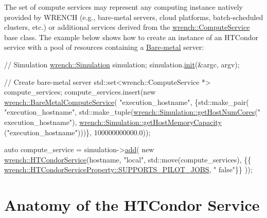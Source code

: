The set of compute services may represent any computing instance natively provided by W\+R\+E\+N\+CH (e.\+g., bare-\/metal servers, cloud platforms, batch-\/scheduled clusters, etc.) or additional services derived from the {\ttfamily \hyperlink{classwrench_1_1_compute_service}{wrench\+::\+Compute\+Service}} base class. The example below shows how to create an instance of an H\+T\+Condor service with a pool of resources containing a \hyperlink{guide-baremetal}{Bare-\/metal} server\+:


\begin{DoxyCode}
\textcolor{comment}{// Simulation }
\hyperlink{classwrench_1_1_simulation}{wrench::Simulation} simulation;
simulation.\hyperlink{classwrench_1_1_simulation_a3c6d35f1f77f35cbc727ce31e5689992}{init}(&argc, argv);

\textcolor{comment}{// Create bare-metal server}
std::set<wrench::ComputeService *> compute\_services;
compute\_services.insert(\textcolor{keyword}{new} \hyperlink{classwrench_1_1_bare_metal_compute_service}{wrench::BareMetalComputeService}(
          \textcolor{stringliteral}{"execution\_hostname"},
          \{std::make\_pair(
                  \textcolor{stringliteral}{"execution\_hostname"},
                  std::make\_tuple(\hyperlink{classwrench_1_1_simulation_a6f0f556690d10d683a61acc3f10f5521}{wrench::Simulation::getHostNumCores}(\textcolor{stringliteral}{"
      execution\_hostname"}),
                                  \hyperlink{classwrench_1_1_simulation_a757dde71d164a89ff52e49c4c52af0b5}{wrench::Simulation::getHostMemoryCapacity}
      (\textcolor{stringliteral}{"execution\_hostname"})))\},
          100000000000.0));

\textcolor{keyword}{auto} compute\_service = simulation->\hyperlink{classwrench_1_1_simulation_ad1f5c12285ecfaf5a2ce7dab5ec8b4c5}{add}(
          \textcolor{keyword}{new} \hyperlink{classwrench_1_1_h_t_condor_service}{wrench::HTCondorService}(hostname, 
                                      \textcolor{stringliteral}{"local"}, 
                                      std::move(compute\_services),
                                      \{\{
      \hyperlink{classwrench_1_1_compute_service_property_af0abab1e3bce4932c4482031f0c31ce8}{wrench::HTCondorServiceProperty::SUPPORTS\_PILOT\_JOBS}, \textcolor{stringliteral}{"
      false"}\}\}
                                      ));
\end{DoxyCode}
\hypertarget{guide-htcondor_guide-htcondor-anatomy}{}\section{Anatomy of the H\+T\+Condor Service}\label{guide-htcondor_guide-htcondor-anatomy}
